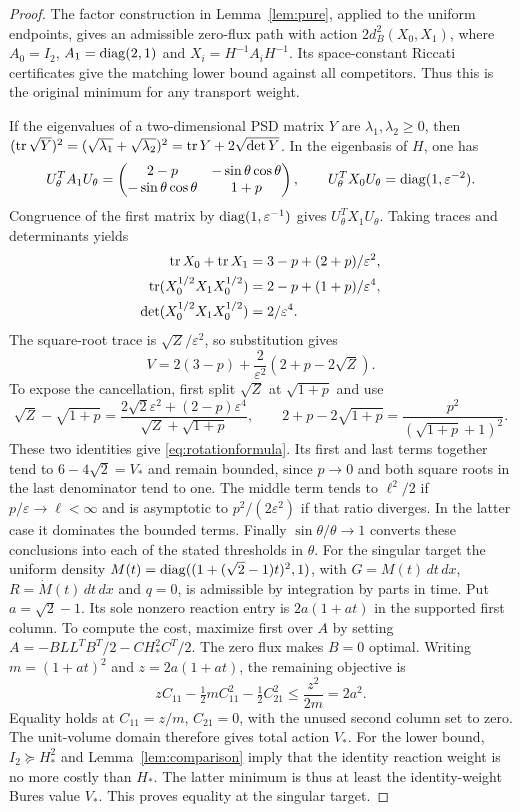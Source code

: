 \begin{proof}
The factor construction in Lemma~\ref{lem:pure}, applied to the uniform
endpoints, gives an admissible zero-flux path with action
$2d_B^2(X_0,X_1)$, where $A_0=I_2$, $A_1=\operatorname{diag}(2,1)$ and
$X_i=H^{-1}A_iH^{-1}$. Its space-constant
Riccati certificates give the matching lower bound against all competitors.
Thus this is the original minimum for any transport weight.

If the eigenvalues of a two-dimensional PSD matrix $Y$ are
$\lambda_1,\lambda_2\ge0$, then
$(\operatorname{tr}\sqrt Y)^2=(\sqrt{\lambda_1}+\sqrt{\lambda_2})^2
=\operatorname{tr} Y+2\sqrt{\det Y}$. In the eigenbasis of $H$, one has
\[
 U_\theta^TA_1U_\theta=
 \begin{pmatrix}2-p&-\sin\theta\cos\theta\\
 -\sin\theta\cos\theta&1+p\end{pmatrix},\qquad
 U_\theta^TX_0U_\theta=\operatorname{diag}(1,\varepsilon^{-2}).
\]
Congruence of the first matrix by $\operatorname{diag}(1,\varepsilon^{-1})$ gives
$U_\theta^TX_1U_\theta$. Taking traces and determinants yields
\begin{align*}
 \operatorname{tr} X_0+\operatorname{tr} X_1&=3-p+(2+p)/\varepsilon^2,\\
 \operatorname{tr}(X_0^{1/2}X_1X_0^{1/2})&=2-p+(1+p)/\varepsilon^4,\\
 \det(X_0^{1/2}X_1X_0^{1/2})&=2/\varepsilon^4.
\end{align*}
The square-root trace is $\sqrt Z/\varepsilon^2$, so substitution gives
\[
 V=2(3-p)+\frac{2}{\varepsilon^2}(2+p-2\sqrt Z).
\]
To expose the cancellation, first split $\sqrt Z$ at $\sqrt{1+p}$ and use
\[
 \sqrt Z-\sqrt{1+p}
 =\frac{2\sqrt2\varepsilon^2+(2-p)\varepsilon^4}
        {\sqrt Z+\sqrt{1+p}},\qquad
 2+p-2\sqrt{1+p}
 =\frac{p^2}{(\sqrt{1+p}+1)^2}.
\]
These two identities give \eqref{eq:rotationformula}. Its first and last
terms together tend to $6-4\sqrt2=V_*$ and remain bounded, since $p\to0$
and both square roots in the last denominator tend to one. The middle
term tends to $\ell^2/2$ if $p/\varepsilon\to\ell<\infty$ and is
asymptotic to $p^2/(2\varepsilon^2)$ if that ratio diverges. In the latter
case it dominates the bounded terms. Finally
$\sin\theta/\theta\to1$ converts these conclusions into each of the stated
thresholds in $\theta$.
For the singular target the uniform density
$M(t)=\operatorname{diag}((1+(\sqrt2-1)t)^2,1)$, with
$G=M(t)\,dt\,dx$, $R=\dot M(t)\,dt\,dx$ and $q=0$, is admissible by
integration by parts in time. Put $a=\sqrt2-1$. Its sole nonzero reaction
entry is $2a(1+at)$ in the supported first column. To compute the cost,
maximize first over $A$ by setting
$A=-BLL^TB^T/2-CH_*^2C^T/2$. The zero flux makes $B=0$ optimal.
Writing $m=(1+at)^2$ and $z=2a(1+at)$, the remaining objective is
\[
 zC_{11}-\tfrac12m C_{11}^2-\tfrac12C_{21}^2
 \le\frac{z^2}{2m}=2a^2.
\]
Equality holds at $C_{11}=z/m$, $C_{21}=0$, with the unused second column
set to zero. The unit-volume domain therefore gives total action $V_*$. For the lower bound, $I_2\succeq H_*^2$ and
Lemma~\ref{lem:comparison} imply that the identity reaction weight is
no more costly than $H_*$. The latter minimum is thus at least the
identity-weight Bures value $V_*$. This proves equality at the singular target.
\end{proof}

